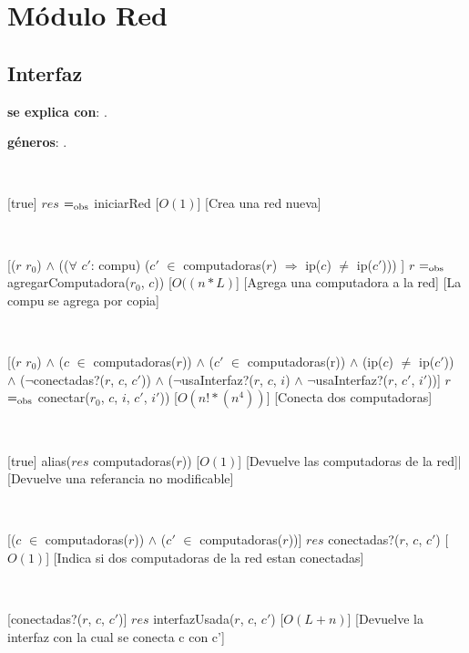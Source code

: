 \section{Módulo Red}

\subsection{Interfaz}

\textbf{se explica con}: .

\textbf{géneros}: .

  ~

  [true]
  {$res$ $=_{\mathrm{obs}}$ iniciarRed}
  [$O(1)$]
  [Crea una red nueva]
  

  ~

  [($r$ \igobs $r_0$) $\land$ (($\forall$ $c'$: compu) ($c'$ $\in$ computadoras($r$) $\Rightarrow$  ip($c$) $\neq$  ip($c'$)))  ]
  {$r$ $=_{\mathrm{obs}}$ agregarComputadora($r_0$, $c$)) }
  [$O((n*L)$]
  [Agrega una computadora a la red]
  [La compu se agrega por copia]

  ~

  [($r$ \igobs $r_0$) $\land$ ($c$ $\in$ computadoras($r$)) $\land$ ($c'$ $\in$ computadoras(r)) $\land$ (ip($c$) $\neq$ ip($c'$)) \\
   $\land$ ($\neg$conectadas?($r$, $c$, $c'$)) $\land$ ($\neg$usaInterfaz?($r$, $c$, $i$) $\land$ $\neg$usaInterfaz?($r$, $c'$, $i'$))]
  {$r$ $=_{\mathrm{obs}}$ conectar($r_0$, $c$, $i$, $c'$, $i'$))}
  [$O(n!*(n^4))$]
  [Conecta dos computadoras]

  ~

  [true]
  {alias($res$ \igobs computadoras($r$))}
  [$O(1)$]
  [Devuelve las computadoras de la red]|
  [Devuelve una referancia no modificable]

  ~

  [($c$ $\in$ computadoras($r$)) $\land$ ($c'$ $\in$ computadoras($r$))]
  {$res$ \igobs conectadas?($r$, $c$, $c'$)}
  [$O(1)$]
  [Indica si dos computadoras de la red estan conectadas]

  ~

  [conectadas?($r$, $c$, $c'$)]
  {$res$ \igobs interfazUsada($r$, $c$, $c'$)}
  [$O(L + n)$]
  [Devuelve la interfaz con la cual se conecta c con c']

